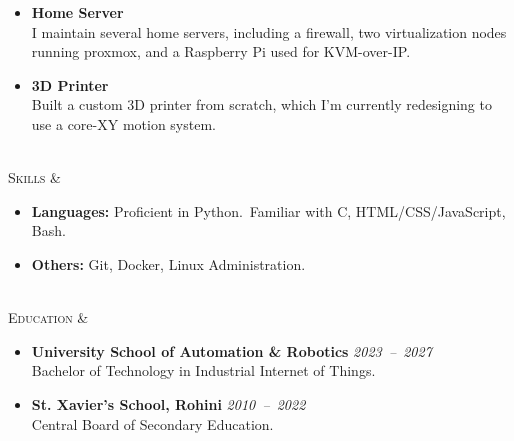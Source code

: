 \documentclass[11pt]{article}
\begin{document}
\begin{tblr}
\begin{itemize}[topsep=0pt,leftmargin=15pt]

            \item \textbf{Home Server}\\
            I maintain several home servers, including a firewall, two virtualization nodes running proxmox, and a
            Raspberry Pi used for KVM-over-IP.


            \item \textbf{3D Printer}\\
            Built a custom 3D printer from scratch, which I'm currently redesigning to use a core-XY motion system.
        \end{itemize}
        \\
        \textsc{\large Skills} &
        \vspace*{-1.5\topsep}
        \begin{itemize}[topsep=0pt,leftmargin=15pt]
            \item \textbf{Languages:} Proficient in Python.\ Familiar with C, HTML/CSS/JavaScript, Bash.
            \item \textbf{Others:} Git, Docker, Linux Administration.
        \end{itemize}
        \\
        \textsc{\large Education} &
        \vspace*{-1.5\topsep}
        \begin{itemize}[topsep=0pt,leftmargin=15pt]
            \item \textbf{University School of Automation \& Robotics} \hfill \textit{2023~--~2027} \\
            Bachelor of Technology in Industrial Internet of Things.
            \item \textbf{St. Xavier's School, Rohini} \hfill \textit{2010~--~2022} \\
            Central Board of Secondary Education.
        \end{itemize}
    \end{tblr}
\end{document}
